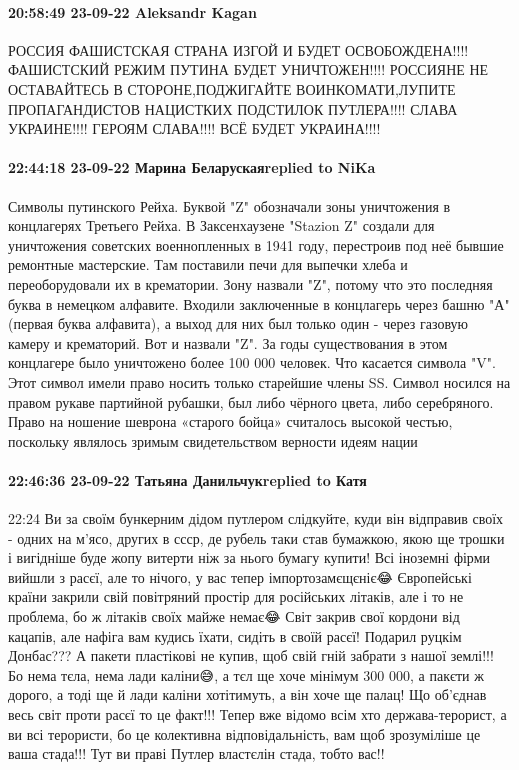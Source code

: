 \paragraph{20:58:49 23-09-22 Aleksandr Kagan}

РОССИЯ ФАШИСТСКАЯ СТРАНА ИЗГОЙ И БУДЕТ ОСВОБОЖДЕНА!!!! ФАШИСТСКИЙ РЕЖИМ ПУТИНА
БУДЕТ УНИЧТОЖЕН!!!! РОССИЯНЕ НЕ ОСТАВАЙТЕСЬ В СТОРОНЕ,ПОДЖИГАЙТЕ
ВОИНКОМАТИ,ЛУПИТЕ ПРОПАГАНДИСТОВ НАЦИСТКИХ ПОДСТИЛОК ПУТЛЕРА!!!! СЛАВА
УКРАИНЕ!!!! ГЕРОЯМ СЛАВА!!!! ВСЁ БУДЕТ УКРАИНА!!!!

\paragraph{22:44:18 23-09-22 Марина Беларускаяreplied to NiKa}

Символы путинского Рейха.
Буквой "Z" обозначали зоны уничтожения в концлагерях Третьего Рейха. В Заксенхаузене "Stazion Z" создали для уничтожения советских военнопленных в 1941 году, перестроив под неё бывшие ремонтные мастерские. Там поставили печи для выпечки хлеба и переоборудовали их в крематории. Зону назвали "Z", потому что это последняя буква в немецком алфавите. Входили заключенные в концлагерь через башню "А" (первая буква алфавита), а выход для них был только один - через газовую камеру и крематорий. Вот и назвали "Z". За годы существования в этом концлагере было уничтожено более 100 000 человек.
Что касается символа "V". Этот символ имели право носить только старейшие члены SS.
Символ носился на правом рукаве партийной рубашки, был либо чёрного цвета, либо серебряного. Право на ношение шеврона «старого бойца» считалось высокой честью, поскольку являлось зримым свидетельством верности идеям нации

\paragraph{22:46:36 23-09-22 Татьяна Данильчукreplied to Катя}
22:24
Ви за своїм бункерним дідом путлером слідкуйте, куди він відправив своїх - одних на м'ясо, других в ссср, де рубель таки став бумажкою, якою ще трошки і вигідніше буде жопу витерти ніж за нього бумагу купити!
Всі іноземні фірми вийшли з расєї, але то нічого, у вас тепер імпортозамєщєніє😂
Європейські країни закрили свій повітряний простір для російських літаків, але і то не проблема, бо ж літаків своїх майже немає😂
Світ закрив свої кордони від кацапів, але нафіга вам кудись їхати, сидіть в своїй расєї! Подарил руцкім Донбас??? А пакети пластікові не купив, щоб свій гній забрати з нашої землі!!! Бо нема тєла, нема лади каліни😅, а тєл ще хоче мінімум 300 000, а пакєти ж дорого, а тоді ще й лади каліни хотітимуть, а він хоче ще палац! Що об'єднав весь світ проти расєї то це факт!!! Тепер вже відомо всім хто держава-терорист, а ви всі терористи, бо це колективна відповідальність, вам щоб зрозуміліше це ваша стада!!! Тут ви праві Путлер властєлін стада, тобто вас!!

